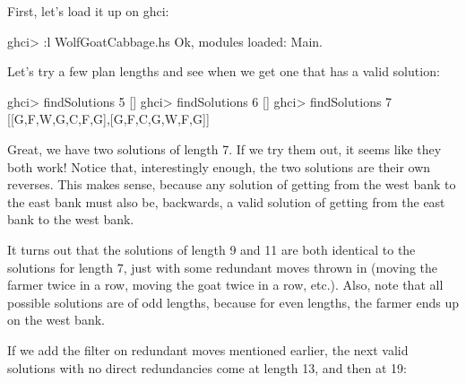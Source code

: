 \documentclass[]{article}
\newenvironment{Shaded}{}{}
\newcommand{\DataTypeTok}[1]{\textcolor[rgb]{0.56,0.13,0.00}{{#1}}}
\newcommand{\DecValTok}[1]{\textcolor[rgb]{0.25,0.63,0.44}{{#1}}}
\newcommand{\FunctionTok}[1]{\textcolor[rgb]{0.02,0.16,0.49}{{#1}}}
\newcommand{\NormalTok}[1]{{#1}}
\begin{document}
First, let's load it up on ghci:

\begin{Shaded}
\begin{Highlighting}[]
\NormalTok{ghci}\FunctionTok{>} \FunctionTok{:}\NormalTok{l WolfGoatCabbage.hs}
\DataTypeTok{Ok}\NormalTok{, modules loaded}\FunctionTok{:} \DataTypeTok{Main}\FunctionTok{.}
\end{Highlighting}
\end{Shaded}

Let's try a few plan lengths and see when we get one that has a valid
solution:

\begin{Shaded}
\begin{Highlighting}[]
\NormalTok{ghci}\FunctionTok{>} \NormalTok{findSolutions }\DecValTok{5}
\NormalTok{[]}
\NormalTok{ghci}\FunctionTok{>} \NormalTok{findSolutions }\DecValTok{6}
\NormalTok{[]}
\NormalTok{ghci}\FunctionTok{>} \NormalTok{findSolutions }\DecValTok{7}
\NormalTok{[[}\DataTypeTok{G}\NormalTok{,}\DataTypeTok{F}\NormalTok{,}\DataTypeTok{W}\NormalTok{,}\DataTypeTok{G}\NormalTok{,}\DataTypeTok{C}\NormalTok{,}\DataTypeTok{F}\NormalTok{,}\DataTypeTok{G}\NormalTok{],[}\DataTypeTok{G}\NormalTok{,}\DataTypeTok{F}\NormalTok{,}\DataTypeTok{C}\NormalTok{,}\DataTypeTok{G}\NormalTok{,}\DataTypeTok{W}\NormalTok{,}\DataTypeTok{F}\NormalTok{,}\DataTypeTok{G}\NormalTok{]]}
\end{Highlighting}
\end{Shaded}

Great, we have two solutions of length 7. If we try them out, it seems
like they both work! Notice that, interestingly enough, the two
solutions are their own reverses. This makes sense, because any solution
of getting from the west bank to the east bank must also be, backwards,
a valid solution of getting from the east bank to the west bank.

It turns out that the solutions of length 9 and 11 are both identical to
the solutions for length 7, just with some redundant moves thrown in
(moving the farmer twice in a row, moving the goat twice in a row,
etc.). Also, note that all possible solutions are of odd lengths,
because for even lengths, the farmer ends up on the west bank.

If we add the filter on redundant moves mentioned earlier, the next
valid solutions with no direct redundancies come at length 13, and then
at 19:
\end{document}
